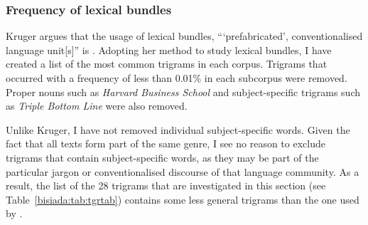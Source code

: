\documentclass[output=paper]{LSP/langsci}
\begin{document}
\subsubsection{Frequency of lexical bundles}

Kruger argues that the usage of lexical bundles, \enquote{\enquote{prefabricated}, conventionalised language unit[s]} is . Adopting her method to study lexical bundles, I have created a list of the most common trigrams in each corpus. Trigrams that occurred with a frequency of less than 0.01\% in each subcorpus were removed. Proper nouns such as \emph{Harvard Business School} and subject-specific trigrams such as \emph{Triple Bottom Line} were also removed.

Unlike Kruger, I have not removed individual subject-specific words. Given the fact that all texts form part of the same genre, I see no reason to exclude trigrams that contain subject-specific words, as they may be part of the particular jargon or conventionalised discourse of that language community. As a result, the list of the 28 trigrams that are investigated in this section (see Table~\ref{bisiada:tab:tgrtab}) contains some less general trigrams than the one used by \textcite[365]{kruger12}.
\end{document}
